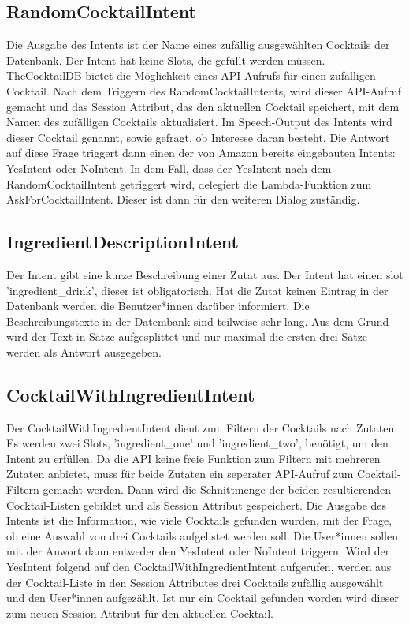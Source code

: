 \documentclass[12pt,letterpaper]{article}
\begin{document}
\subsection{RandomCocktailIntent}
Die Ausgabe des Intents ist der Name eines zufällig ausgewählten Cocktails der Datenbank. Der Intent hat keine Slots, die gefüllt werden müssen. TheCocktailDB bietet die Möglichkeit eines API-Aufrufs für einen zufälligen Cocktail. Nach dem Triggern des RandomCocktailIntents, wird dieser API-Aufruf gemacht und das Session Attribut, das den aktuellen Cocktail speichert, mit dem Namen des zufälligen Cocktails aktualisiert. Im Speech-Output des Intents wird dieser Cocktail genannt, sowie gefragt, ob Interesse daran besteht. Die Antwort auf diese Frage triggert dann einen der von Amazon bereits eingebauten Intents: YesIntent oder NoIntent. In dem Fall, dass der YesIntent nach dem RandomCocktailIntent getriggert wird, delegiert die Lambda-Funktion zum AskForCocktailIntent. Dieser ist dann für den weiteren Dialog zuständig.  \\

\subsection{IngredientDescriptionIntent}
Der Intent gibt eine kurze Beschreibung einer Zutat aus. Der Intent hat einen slot 'ingredient\_drink', dieser ist obligatorisch. Hat die Zutat keinen Eintrag in der Datenbank werden die Benutzer*innen darüber informiert. Die Beschreibungstexte in der Datembank sind teilweise sehr lang. Aus dem Grund wird der Text in Sätze aufgesplittet und nur maximal die ersten drei Sätze werden als Antwort ausgegeben.
\subsection{CocktailWithIngredientIntent}
Der CocktailWithIngredientIntent dient zum Filtern der Cocktails nach Zutaten. Es werden zwei Slots, 'ingredient\_one' und 'ingredient\_two', benötigt, um den Intent zu erfüllen. Da die API keine freie Funktion zum Filtern mit mehreren Zutaten anbietet, muss für beide Zutaten ein seperater API-Aufruf zum Cocktail-Filtern gemacht werden. Dann wird die Schnittmenge der beiden resultierenden Cocktail-Listen gebildet und als Session Attribut gespeichert. Die Ausgabe des Intents ist die Information, wie viele Cocktails gefunden wurden, mit der Frage, ob eine Auswahl von drei Cocktails aufgelistet werden soll. Die User*innen sollen mit der Anwort dann entweder den YesIntent oder NoIntent triggern. Wird der YesIntent folgend auf den CocktailWithIngredientIntent aufgerufen, werden aus der Cocktail-Liste in den Session Attributes drei Cocktails zufällig ausgewählt und den User*innen aufgezählt. Ist nur ein Cocktail gefunden worden wird dieser zum neuen Session Attribut für den aktuellen Cocktail. \\

\end{document}
